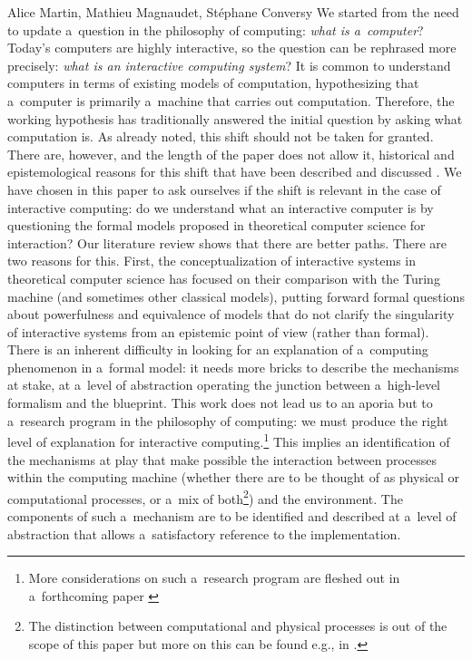 \begin{artengenv2auth}{Alice Martin, Mathieu Magnaudet, Stéphane Conversy}
We started from the need to update a~question in the philosophy of computing: \textit{what is a~computer}? Today's computers are highly interactive, so the question can be rephrased more precisely: \textit{what is an interactive computing system}? It is common to understand computers in terms of existing models of computation, hypothesizing that a~computer is primarily a~machine that carries out computation. Therefore, the working hypothesis has traditionally answered the initial question by asking what computation is. As already noted, this shift should not be taken for granted. There are, however, and the length of the paper does not allow it, historical and epistemological reasons for this shift that have been described and discussed \parencite{Daylight2014, DeMol2018a, Haigh2020}. We have chosen in this paper to ask ourselves if the shift is relevant in the case of interactive computing: do we understand what an interactive computer is by questioning the formal models proposed in theoretical computer science for interaction? Our literature review shows that there are better paths. There are two reasons for this. First, the conceptualization of interactive systems in theoretical computer science has focused on their comparison with the Turing machine (and sometimes other classical models), putting forward formal questions about powerfulness and equivalence of models that do not clarify the singularity of interactive systems from an epistemic point of view (rather than formal). There is an inherent difficulty in looking for an explanation of a~computing phenomenon in a~formal model: it needs more bricks to describe the mechanisms at stake, at a~level of abstraction operating the junction between a~high-level formalism and the blueprint. This work does not lead us to an aporia but to a~research program in the philosophy of computing: we must produce the right level of explanation for interactive computing.\footnote{More considerations on such a~research program are fleshed out in a~forthcoming paper \parencite{Martin2023}} This implies an identification of the mechanisms at play that make possible the interaction between processes within the computing machine (whether there are to be thought of as physical or computational processes, or a~mix of both\footnote{The distinction between computational and physical processes is out of the scope of this paper but more on this can be found e.g., in \parencite{Kycia_Niemczynowicz_2020}.}) and the environment. The components of such a~mechanism are to be identified and described at a~level of abstraction that allows a~satisfactory reference to the implementation. 

 


%
%
%
%

\end{artengenv2auth}

